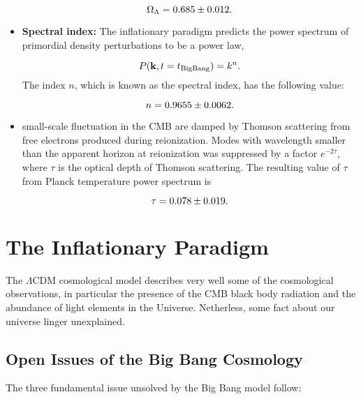 \begin{itemize}
        \begin{equation}
                \Omega_\Lambda = \num{0.685 \pm 0.012}.
        \end{equation}

        \item \textbf{Spectral index:} The inflationary paradigm predicts
        the power spectrum of primordial density perturbations to be a
        power law,

        \begin{equation}
                P\qty(\vb{k},t = t_\text{BigBang}) = k^n.
        \end{equation}
        The index $n$, which is known as the spectral index, has the
        following value:

        \begin{equation}
                n = \num{0.9655 \pm 0.0062}.
        \end{equation}

        \item small-scale fluctuation in the CMB are damped by Thomson
        scattering from free electrons produced during reionization. Modes
        with wavelength smaller than the apparent horizon at reionization
        was suppressed by a factor $e^{-2\tau}$, where $\tau$ is the optical
        depth of Thomson scattering. The resulting value of $\tau$ from Planck
        temperature power spectrum is

        \begin{equation}
                \tau = \num{0.078 \pm 0.019}.
        \end{equation}
\end{itemize}

\section{The Inflationary Paradigm}

The $\Lambda$CDM cosmological model describes very well some of the
cosmological observations, in particular the presence of the CMB black
body radiation and the abundance of light elements in the Universe.
Netherless, some fact about our universe linger unexplained.

\subsection{Open Issues of the Big Bang Cosmology}\label{ss:issues}

The three fundamental issue unsolved by the Big Bang model follow:

